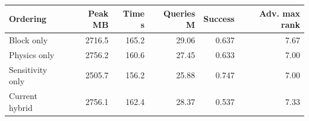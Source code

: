 \begin{tabular}{lrrrrr}
\toprule
Ordering & Peak MB & Time s & Queries M & Success & Adv. max rank \\
\midrule
Block only & 2716.5 & 165.2 & 29.06 & 0.637 & 7.67 \\
Physics only & 2756.2 & 160.6 & 27.45 & 0.633 & 7.00 \\
Sensitivity only & 2505.7 & 156.2 & 25.88 & 0.747 & 7.00 \\
Current hybrid & 2756.1 & 162.4 & 28.37 & 0.537 & 7.33 \\
\bottomrule
\end{tabular}
